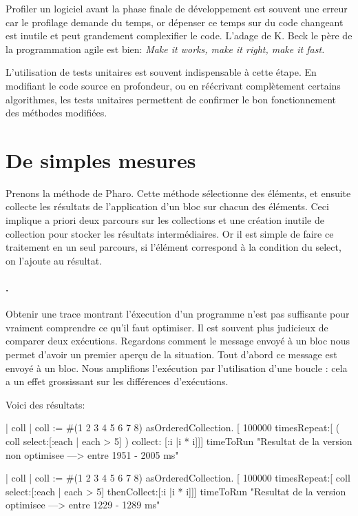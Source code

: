 \documentclass[a4paper,10pt,twoside]{book}
\begin{document}
Profiler un logiciel avant la phase finale de d\'eveloppement est souvent une erreur car le profilage demande du temps, or d\'epenser ce temps sur du code changeant est inutile et peut grandement complexifier le code. L'adage de K. Beck le p\`ere de la programmation agile est bien:  \textit{Make it works, make it right, make it fast.}

L'utilisation de tests unitaires est souvent indispensable \`a cette \'etape. En modifiant le code source en profondeur, ou en r\'e\'ecrivant compl\`etement certains algorithmes, les tests unitaires permettent de confirmer le bon fonctionnement des m\'ethodes modifi\'ees. 


\section{De simples mesures}

Prenons la m\'ethode  de Pharo.
Cette m\'ethode s\'electionne des \'el\'ements, et ensuite collecte les r\'esultats de l'application d'un bloc sur chacun des \'el\'ements. Ceci implique  a priori deux parcours sur les collections et une cr\'eation inutile de collection pour stocker les r\'esultats interm\'ediaires. Or il est simple de faire ce traitement en un seul parcours, si l'\'el\'ement correspond \`a la condition du select, on l'ajoute au r\'esultat.

\paragraph{.} Obtenir une trace montrant l'\'execution d'un programme n'est pas suffisante pour vraiment comprendre ce qu'il faut optimiser. 
Il est souvent plus judicieux de comparer deux ex\'ecutions. Regardons
comment le message  envoy\'e \`a un bloc nous permet d'avoir un premier aper\c cu de la situation. Tout d'abord ce message est envoy\'e \`a un bloc. Nous amplifions l'ex\'ecution par l'utilisation d'une boucle : cela a un effet grossissant sur les diff\'erences d'ex\'ecutions. 


Voici des r\'esultats:
\begin{code}{}
	| coll |
	coll := #(1 2 3 4 5 6 7 8) asOrderedCollection. 
	[ 100000 timesRepeat:[ ( coll select:[:each | each > 5] ) collect: [:i |i * i]]] timeToRun
	"Resultat de la version non optimisee ---> entre 1951 - 2005 ms"

	| coll |
	coll := #(1 2 3 4 5 6 7 8) asOrderedCollection. 
	[ 100000 timesRepeat:[ coll select:[:each | each > 5] thenCollect:[:i |i * i]]] timeToRun
	"Resultat de la version optimisee ---> entre 1229 - 1289 ms"
\end{code}
\end{document}
